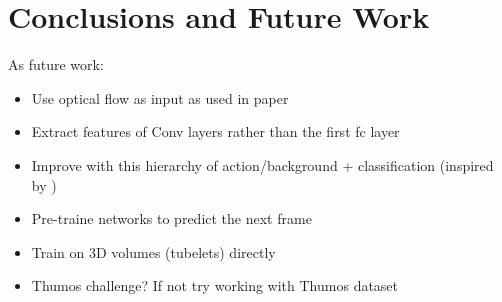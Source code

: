 \chapter{Conclusions and Future Work}

\blindtext


As future work:
\begin{itemize}
    \item Use optical flow as input as used in paper \cite{simonyan2014two}\cite{Ng_2015_CVPR}\cite{Yao_2015_ICCV}
    \item Extract features of Conv layers rather than the first fc layer
    \item Improve with this hierarchy of action/background + classification (inspired by \cite{shoutemporal})
    \item Pre-traine networks to predict the next frame
    \item Train on 3D volumes (tubelets) directly
    \item Thumos challenge? If not try working with Thumos dataset\cite{THUMOS15}
\end{itemize}
